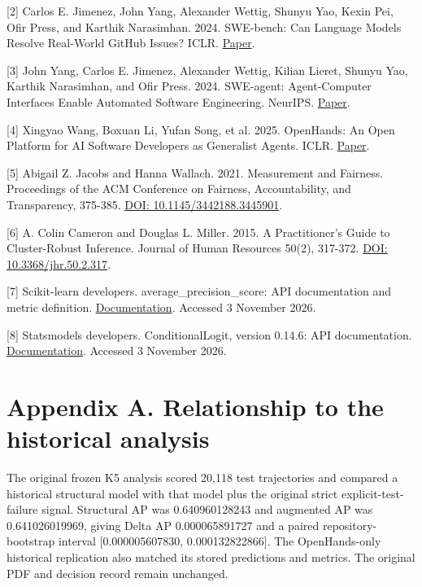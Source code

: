 \documentclass[10pt,a4paper]{article}
\begin{document}
[2] Carlos E. Jimenez, John Yang, Alexander Wettig, Shunyu Yao, Kexin Pei, Ofir Press, and Karthik Narasimhan. 2024. SWE-bench: Can Language Models Resolve Real-World GitHub Issues? ICLR. \href{https://arxiv.org/abs/2310.06770}{Paper}.

[3] John Yang, Carlos E. Jimenez, Alexander Wettig, Kilian Lieret, Shunyu Yao, Karthik Narasimhan, and Ofir Press. 2024. SWE-agent: Agent-Computer Interfaces Enable Automated Software Engineering. NeurIPS. \href{https://arxiv.org/abs/2405.15793}{Paper}.

[4] Xingyao Wang, Boxuan Li, Yufan Song, et al. 2025. OpenHands: An Open Platform for AI Software Developers as Generalist Agents. ICLR. \href{https://arxiv.org/abs/2407.16741}{Paper}.

[5] Abigail Z. Jacobs and Hanna Wallach. 2021. Measurement and Fairness. Proceedings of the ACM Conference on Fairness, Accountability, and Transparency, 375-385. \href{https://doi.org/10.1145/3442188.3445901}{DOI: 10.1145/3442188.3445901}.

[6] A. Colin Cameron and Douglas L. Miller. 2015. A Practitioner's Guide to Cluster-Robust Inference. Journal of Human Resources 50(2), 317-372. \href{https://doi.org/10.3368/jhr.50.2.317}{DOI: 10.3368/jhr.50.2.317}.

[7] Scikit-learn developers. average\_precision\_score: API documentation and metric definition. \href{https://sklearn.org/stable/modules/generated/sklearn.metrics.average\_precision\_score.html}{Documentation}. Accessed 3 November 2026.

[8] Statsmodels developers. ConditionalLogit, version 0.14.6: API documentation. \href{https://www.statsmodels.org/v0.14.6/generated/statsmodels.discrete.conditional\_models.ConditionalLogit.html}{Documentation}. Accessed 3 November 2026.

\clearpage
\section{Appendix A. Relationship to the historical analysis}
The original frozen K5 analysis scored 20,118 test trajectories and compared a historical structural model with that model plus the original strict explicit-test-failure signal. Structural AP was 0.640960128243 and augmented AP was 0.641026019969, giving Delta AP 0.000065891727 and a paired repository-bootstrap interval [0.000005607830, 0.000132822866]. The OpenHands-only historical replication also matched its stored predictions and metrics. The original PDF and decision record remain unchanged.
\end{document}
